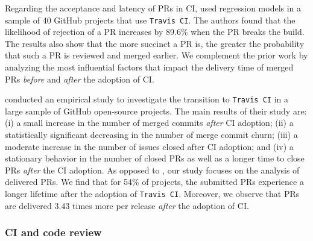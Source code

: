 Regarding the acceptance and latency of PRs in CI, 
\cite{Yu2016-cy} used regression models in a sample of 40 GitHub projects that
use \texttt{Travis CI}. The authors found that the likelihood of rejection of a PR
increases by 89.6\% when the PR breaks the build.  The results also show that
the more succinct a PR is, the greater the probability that such a PR is
reviewed and merged earlier. We complement the prior work by analyzing the most
influential factors that impact the delivery time of merged PRs \textit{before}
and \textit{after} the adoption of CI.

\cite{zhao2017impact} conducted an empirical study to investigate the
transition to \texttt{Travis CI} in a large sample of GitHub open-source projects. 
The main results of their study are: (i) a
small increase in the number of merged commits \textit{after} CI adoption;  (ii) a
statistically significant decreasing in the number of merge commit churn; (iii)
a moderate increase in the number of issues closed after CI adoption; and (iv)
a stationary behavior in the number of closed PRs as well as a longer
time to close PRs \textit{after} the CI adoption. As opposed to 
\cite{zhao2017impact}, our study focuses on the analysis of delivered PRs. We find that for 54\% of projects, the submitted PRs experience a
longer lifetime after the adoption of \texttt{Travis CI}. Moreover, we observe that PRs
are delivered 3.43 times more per release {\em after} the adoption of CI.


\subsubsection*{\textbf{CI and code review}}

